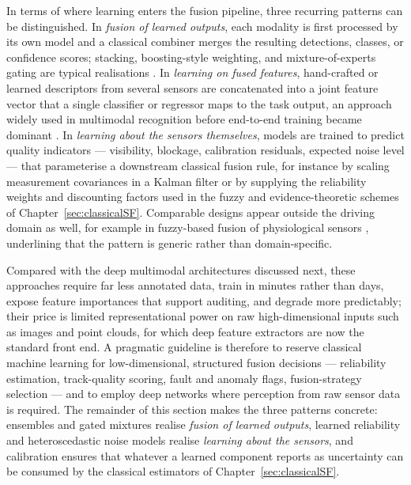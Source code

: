\documentclass[graybox,envcountchap]{style/SNmono}
\begin{document}
In terms of where learning enters the fusion pipeline, three recurring patterns can be distinguished. In \emph{fusion of learned outputs}, each modality is first processed by its own model and a classical combiner merges the resulting detections, classes, or confidence scores; stacking, boosting-style weighting, and mixture-of-experts gating are typical realisations \cite{breiman2001_rf,khaleghi_multisensor_2013}. In \emph{learning on fused features}, hand-crafted or learned descriptors from several sensors are concatenated into a joint feature vector that a single classifier or regressor maps to the task output, an approach widely used in multimodal recognition before end-to-end training became dominant \cite{atrey_multimodal_2010,gao_survey_2020}. In \emph{learning about the sensors themselves}, models are trained to predict quality indicators --- visibility, blockage, calibration residuals, expected noise level --- that parameterise a downstream classical fusion rule, for instance by scaling measurement covariances in a Kalman filter or by supplying the reliability weights and discounting factors used in the fuzzy and evidence-theoretic schemes of Chapter~\ref{sec:classicalSF}. Comparable designs appear outside the driving domain as well, for example in fuzzy-based fusion of physiological sensors \cite{testa_fuzzyfusion_2025}, underlining that the pattern is generic rather than domain-specific.

Compared with the deep multimodal architectures discussed next, these approaches require far less annotated data, train in minutes rather than days, expose feature importances that support auditing, and degrade more predictably; their price is limited representational power on raw high-dimensional inputs such as images and point clouds, for which deep feature extractors \cite{guo_deep_2019} are now the standard front end. A pragmatic guideline is therefore to reserve classical machine learning for low-dimensional, structured fusion decisions --- reliability estimation, track-quality scoring, fault and anomaly flags, fusion-strategy selection --- and to employ deep networks where perception from raw sensor data is required.
The remainder of this section makes the three patterns concrete: ensembles and gated mixtures realise \emph{fusion of learned outputs}, learned reliability and heteroscedastic noise models realise \emph{learning about the sensors}, and calibration ensures that whatever a learned component reports as uncertainty can be consumed by the classical estimators of Chapter~\ref{sec:classicalSF}.
\end{document}
